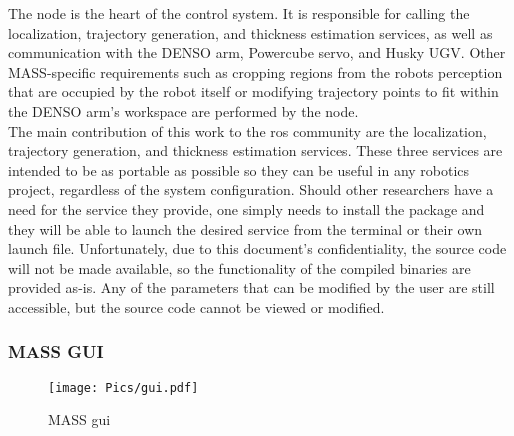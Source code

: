 The  node is the heart of the control system. It is responsible for calling the localization, trajectory generation, and thickness estimation services, as well as communication with the DENSO arm, Powercube servo, and Husky UGV. Other MASS-specific requirements such as cropping regions from the robots perception that are occupied by the robot itself or  modifying trajectory points to fit within the DENSO arm's workspace are performed by the  node. \\

The main contribution of this work to the \acrshort{ros} community are the localization, trajectory generation, and thickness estimation services. These three services are intended to be as portable as possible so they can be useful in any robotics project, regardless of the system configuration. Should other researchers have a need for the service they provide, one simply needs to install the package and they will be able to launch the desired service from the terminal or their own launch file. Unfortunately, due to this document's confidentiality, the source code will not be made available, so the functionality of the compiled binaries are provided as-is. Any of the parameters that can be modified by the user are still accessible, but the source code cannot be viewed or modified.\\

\subsubsection{MASS GUI}
\label{sub:gui}

\begin{figure}[ht!]
    \centering
    \texttt{[image: Pics/gui.pdf]}
    \caption{MASS \acrshort{gui}}
    \label{fig:thegui}
\end{figure}


